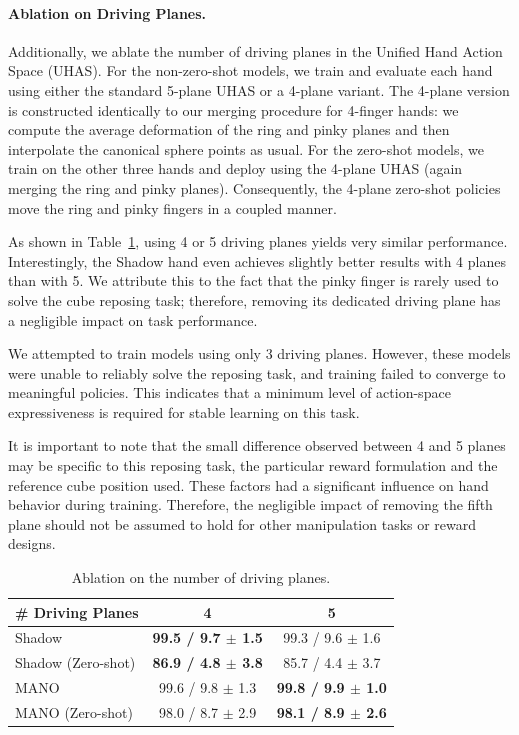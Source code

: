 \paragraph{Ablation on Driving Planes.}
Additionally, we ablate the number of driving planes in the Unified Hand Action Space (UHAS). For the non-zero-shot models, we train and evaluate each hand using either the standard 5-plane UHAS or a 4-plane variant. The 4-plane version is constructed identically to our merging procedure for 4-finger hands: we compute the average deformation of the ring and pinky planes and then interpolate the canonical sphere points as usual. For the zero-shot models, we train on the other three hands and deploy using the 4-plane UHAS (again merging the ring and pinky planes). Consequently, the 4-plane zero-shot policies move the ring and pinky fingers in a coupled manner.

As shown in Table~\ref{tab:driving_planes_ablation}, using 4 or 5 driving planes yields very similar performance. Interestingly, the Shadow hand even achieves slightly better results with 4 planes than with 5. We attribute this to the fact that the pinky finger is rarely used to solve the cube reposing task; therefore, removing its dedicated driving plane has a negligible impact on task performance.

We attempted to train models using only 3 driving planes. However, these models were unable to reliably solve the reposing task, and training failed to converge to meaningful policies. This indicates that a minimum level of action-space expressiveness is required for stable learning on this task.

It is important to note that the small difference observed between 4 and 5 planes may be specific to this reposing task, the particular reward formulation and the reference cube position used. These factors had a significant influence on hand behavior during training. Therefore, the negligible impact of removing the fifth plane should not be assumed to hold for other manipulation tasks or reward designs.

\begin{table}[h]
\centering
\caption{Ablation on the number of driving planes.}
\label{tab:driving_planes_ablation}
\vspace{-2mm}
\setlength{\tabcolsep}{8pt}
\begin{tabular}{lcc}
\toprule
\textbf{\# Driving Planes} & \textbf{4} & \textbf{5} \\
\midrule
Shadow                  & \textbf{99.5 / 9.7 $\pm$ 1.5} & 99.3 / 9.6 $\pm$ 1.6 \\
Shadow (Zero-shot)      & \textbf{86.9 / 4.8 $\pm$ 3.8} & 85.7 / 4.4 $\pm$ 3.7 \\
MANO                    & 99.6 / 9.8 $\pm$ 1.3 & \textbf{99.8 / 9.9 $\pm$ 1.0} \\
MANO (Zero-shot)        & 98.0 / 8.7 $\pm$ 2.9 & \textbf{98.1 / 8.9 $\pm$ 2.6} \\
\bottomrule
\end{tabular}
\vspace{-2mm}
\end{table}

